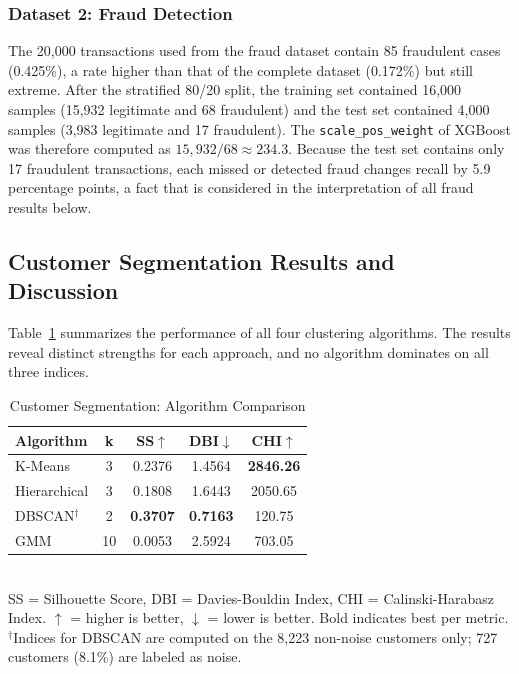 \documentclass[conference]{IEEEtran}
\begin{document}
\subsubsection{Dataset 2: Fraud Detection}
The 20,000 transactions used from the fraud dataset contain 85 fraudulent cases (0.425\%), a rate higher than that of the complete dataset (0.172\%) but still extreme. After the stratified 80/20 split, the training set contained 16,000 samples (15,932 legitimate and 68 fraudulent) and the test set contained 4,000 samples (3,983 legitimate and 17 fraudulent). The \texttt{scale\_pos\_weight} of XGBoost was therefore computed as $15{,}932/68\approx 234.3$. Because the test set contains only 17 fraudulent transactions, each missed or detected fraud changes recall by 5.9 percentage points, a fact that is considered in the interpretation of all fraud results below.

\subsection{Customer Segmentation Results and Discussion}

Table~\ref{tab:seg_results} summarizes the performance of all four clustering algorithms. The results reveal distinct strengths for each approach, and no algorithm dominates on all three indices.

\begin{table}[!t]
\centering
\caption{Customer Segmentation: Algorithm Comparison}
\label{tab:seg_results}
\renewcommand{\arraystretch}{1.3}
\begin{tabular}{|l|c|c|c|c|}
\hline
\textbf{Algorithm} & \textbf{k} & \textbf{SS}$\uparrow$ & \textbf{DBI}$\downarrow$ & \textbf{CHI}$\uparrow$ \\
\hline
K-Means & 3 & 0.2376 & 1.4564 & \textbf{2846.26} \\
Hierarchical & 3 & 0.1808 & 1.6443 & 2050.65 \\
DBSCAN$^{\dagger}$ & 2 & \textbf{0.3707} & \textbf{0.7163} & 120.75 \\
GMM & 10 & 0.0053 & 2.5924 & 703.05 \\
\hline
\end{tabular}
\\[4pt]
\footnotesize{SS = Silhouette Score, DBI = Davies-Bouldin Index, CHI = Calinski-Harabasz Index. $\uparrow$ = higher is better, $\downarrow$ = lower is better. Bold indicates best per metric. $^{\dagger}$Indices for DBSCAN are computed on the 8,223 non-noise customers only; 727 customers (8.1\%) are labeled as noise.}
\end{table}
\end{document}

